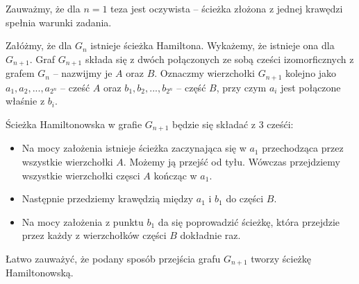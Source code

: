 Zauważmy, że dla $n = 1$ teza jest oczywista -- ścieżka złożona z jednej krawędzi spełnia warunki zadania.

Załóżmy, że dla $G_n$ istnieje ścieżka Hamiltona. Wykażemy, że istnieje ona dla $G_{n + 1}$. Graf $G_{n+1}$ składa się z dwóch połączonych ze sobą cześci izomorficznych z grafem $G_n$ -- nazwijmy je $A$ oraz $B$. Oznaczmy wierzchołki $G_{n + 1}$ kolejno jako
$a_1, a_2, ..., a_{2^n}$ -- cześć $A$ oraz $b_1, b_2, ..., b_{2^n}$ -- część $B$, przy czym $a_i$ jest połączone właśnie z $b_i$. 

Ścieżka Hamiltonowska w grafie $G_{n + 1}$ będzie się składać z 3 cześći:

\begin{itemize}
	\item Na mocy założenia istnieje ścieżka zaczynająca się w $a_1$ przechodząca przez wszystkie wierzchołki $A$. Możemy ją przejść od tyłu. Wówczas przejdziemy wszystkie wierzchołki częsci $A$ kończąc w $a_1$.
	\item Następnie przedziemy krawędzią między $a_1$ i $b_1$ do części $B$.
	\item Na mocy założenia z punktu $b_1$ da się poprowadzić ścieżkę, która przejdzie przez każdy z wierzchołków części $B$ dokładnie raz.
\end{itemize}

Łatwo zauważyć, że podany sposób przejścia grafu $G_{n + 1}$ tworzy ścieżkę Hamiltonowską.
